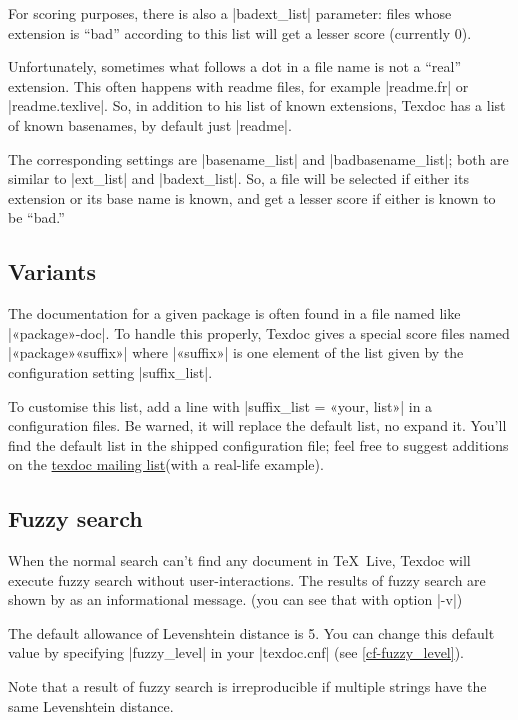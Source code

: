 \documentclass[a4paper, oneside]{scrartcl}
\newcommand\texlive{\TeX~Live\xspace}
\newcommand\tdml{\href{http://lists.tug.org/texdoc}{texdoc mailing list}\xspace}
\begin{document}
For scoring purposes, there is also a |badext_list| parameter: files whose
extension is ``bad'' according to this list will get a lesser score (currently
0).

Unfortunately, sometimes what follows a dot in a file name is not a ``real''
extension. This often happens with readme files, for example |readme.fr| or
|readme.texlive|. So, in addition to his list of known extensions, Texdoc has
a list of known basenames, by default just |readme|.

The corresponding settings are |basename_list| and |badbasename_list|; both
are similar to |ext_list| and |badext_list|. So, a file will be selected if
either its extension or its base name is known, and get a lesser score if
either is known to be ``bad.''

\subsection{Variants}\label{ss-variants}

The documentation for a given package is often found in a file named like
|«package»-doc|. To handle this properly, Texdoc gives a special score files
named |«package»«suffix»| where |«suffix»| is one element of the list given by
the configuration setting |suffix_list|.

To customise this list, add a line with |suffix_list = «your, list»| in a
configuration files. Be warned, it will replace the default list, no expand
it. You'll find the default list in the shipped configuration file; feel free
to suggest additions on the \tdml (with a real-life example).

\subsection{Fuzzy search}\label{ss-fuzzy}

When the normal search can't find any document in \texlive, Texdoc will execute
fuzzy search without user-interactions. The results of fuzzy search are shown
by as an informational message. (you can see that with option |-v|)

The default allowance of Levenshtein distance is 5. You can change this
default value by specifying |fuzzy_level| in your |texdoc.cnf| (see
\ref{cf-fuzzy_level}).

Note that a result of fuzzy search is irreproducible if multiple strings have
the same Levenshtein distance.

\clearpage
\end{document}
